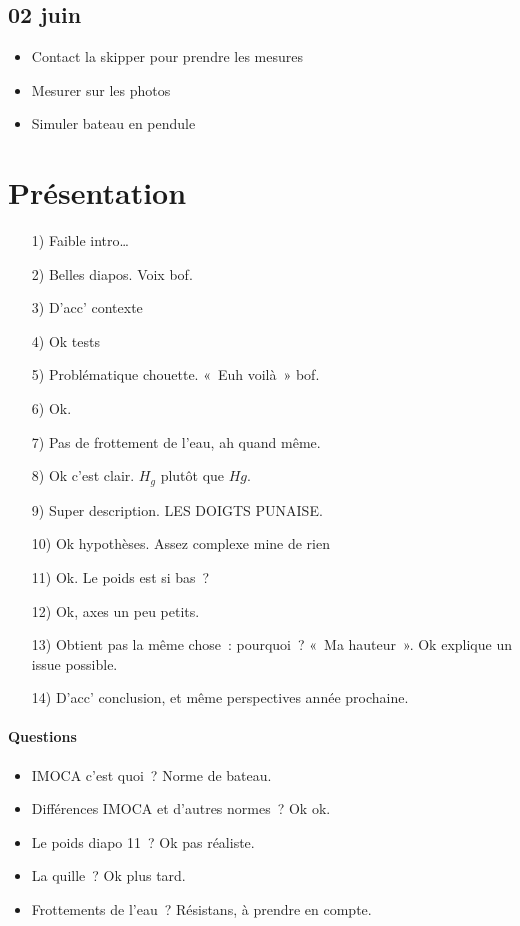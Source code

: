\documentclass[a4paper, 11pt, final, garamond]{book}
\begin{document}
\subsection{02 juin}
\begin{itemize}
  \item Contact la skipper pour prendre les mesures
  \item Mesurer sur les photos
  \item Simuler bateau en pendule
\end{itemize}

\section{Présentation}

\begin{enumerate}
  \item[1)] Faible intro…
  \item[2)] Belles diapos. Voix bof.
  \item[3)] D'acc' contexte
  \item[4)] Ok tests
  \item[5)] Problématique chouette. «~Euh voilà~» bof.
  \item[6)] Ok.
  \item[7)] Pas de frottement de l'eau, ah quand même.
  \item[8)] Ok c'est clair. $H_g$ plutôt que $Hg$.
  \item[9)] Super description. LES DOIGTS PUNAISE.
  \item[10)] Ok hypothèses. Assez complexe mine de rien
  \item[11)] Ok. Le poids est si bas~?
  \item[12)] Ok, axes un peu petits.
  \item[13)] Obtient pas la même chose~: pourquoi~? «~Ma hauteur~». Ok explique
    un issue possible.
  \item[14)] D'acc' conclusion, et même perspectives année prochaine.
\end{enumerate}

\paragraph*{Questions}
\begin{itemize}
  \item IMOCA c'est quoi~? Norme de bateau.
  \item Différences IMOCA et d'autres normes~? Ok ok.
  \item Le poids diapo 11~? Ok pas réaliste.
  \item La quille~? Ok plus tard.
  \item Frottements de l'eau~? Résistans, à prendre en compte.
\end{itemize}
\end{document}
